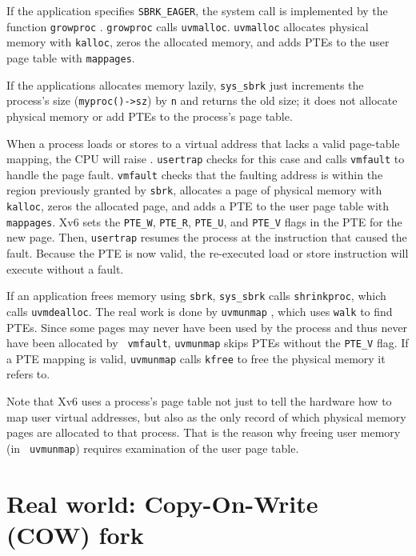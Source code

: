 If the application specifies \lstinline{SBRK_EAGER}, the system
call is implemented by the function
\lstinline{growproc}
.
\lstinline{growproc} calls \lstinline{uvmalloc}.
\lstinline{uvmalloc}
allocates physical memory with {\tt kalloc}, zeros the allocated memory,
and adds PTEs to the user page table with {\tt mappages}.

If the applications allocates memory lazily, \lstinline{sys_sbrk}
just increments the process's size
(\lstinline{myproc()->sz}) by {\tt n} and returns the old size; it does
not allocate physical memory or add PTEs to the process's page table.

When a process loads or stores to a virtual address that
lacks a valid page-table mapping, the CPU will
raise .
\lstinline{usertrap} checks for this case
and calls \lstinline{vmfault}
to handle the page fault.  \lstinline{vmfault}
checks that the faulting address is within the
region previously granted by {\tt sbrk},
allocates a page of physical memory with {\tt kalloc},
zeros the allocated page, and adds a PTE to the user page table with
{\tt mappages}.  Xv6 sets the \lstinline{PTE_W}, \lstinline{PTE_R},
\lstinline{PTE_U}, and \lstinline{PTE_V} flags in the PTE for the
new page. Then, \lstinline{usertrap} resumes the
process at the instruction that caused the fault. Because the
PTE is now valid, the re-executed load or store instruction
will execute without a fault.

If an application frees memory using {\tt sbrk}, \lstinline{sys_sbrk}
calls \lstinline{shrinkproc}, which calls \lstinline{uvmdealloc}.  The
real work is done by {\tt uvmunmap} ,
which uses {\tt walk} to find PTEs.  Since some pages may never have
been used by the process and thus never have been allocated by {\tt
  vmfault}, {\tt uvmunmap} skips PTEs without the \lstinline{PTE_V}
flag.  If a PTE mapping is valid, {\tt uvmunmap} calls {\tt kfree}
to free the physical memory it refers to.

Note that Xv6 uses a process's page table not just to tell the
hardware how to map user virtual addresses, but also as the only
record of which physical memory pages are allocated to that
process. That is the reason why freeing user memory (in {\tt
  uvmunmap}) requires examination of the user page table.

\section{Real world: Copy-On-Write (COW) fork}


